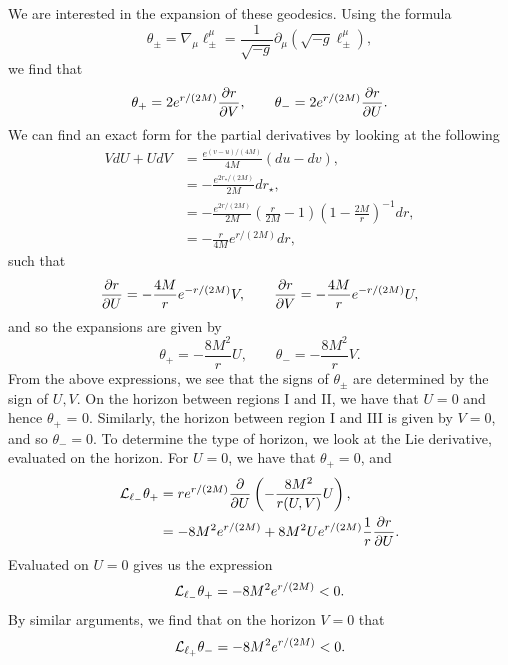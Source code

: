 We are interested in the expansion of these geodesics. Using the formula
\begin{equation*}
	\theta_\pm = \nabla_\mu \ell^{\mu}_\pm = \frac{1}{\sqrt{-g}} \partial_\mu \left(\sqrt{-g} \ell^\mu_\pm \right),
\end{equation*}
we find that
\begin{equation*}
	\theta_+ = 2 e^{r/(2M)} \frac{\partial r}{\partial V}, \qquad \theta_- = 2 e^{r/(2M)} \frac{\partial r}{\partial U}.
\end{equation*}
We can find an exact form for the partial derivatives by looking at the following
\begin{equation*}
\begin{aligned}
		VdU + UdV &= \frac{e^{(v-u)/(4M)}}{4M} \left( du - dv \right), \\
		&= - \frac{e^{2r_\star / (2M)}}{2M} dr_\star ,\\
		&= - \frac{e^{2r / (2M)}}{2M} \left(\frac{r}{2M} - 1\right) \left(1 - \frac{2M}{r} \right)^{-1}  dr ,\\
		&= - \frac{r}{4M} e^{r/(2M)} dr,
\end{aligned}
\end{equation*}
such that
\begin{equation*}
	\frac{\partial r}{\partial U} = - \frac{4M}{r} e^{-r/(2M)} V, \qquad \frac{\partial r}{\partial V} = - \frac{4M}{r} e^{-r/(2M)} U,
\end{equation*}
and so the expansions are given by
\begin{equation*}
	\theta_+ = - \frac{8M^2}{r} U, \qquad \theta_- = - \frac{8M^2}{r} V.
\end{equation*}
From the above expressions, we see that the signs of $\theta_\pm$ are determined by the sign of $U,V$. On the horizon between regions I and II, we have that $U = 0$ and hence $\theta_+$ = 0. Similarly,  the horizon between region I and III is given by $V = 0$, and so $\theta_- = 0$. To determine the type of horizon, we look at the Lie derivative, evaluated on the horizon. For $U = 0$, we have that $\theta_+ = 0$, and 
\begin{equation*}
\begin{aligned}
	{\cal L}_{\ell_-} \theta_+ &= r e^{r / (2M)} \frac{\partial }{\partial U} \left(- \frac{8M^2}{r(U,V)} U \right), \\
	&= -8M^2 e^{r / (2M)} + 8M^2 U e^{r / (2M)}\frac{1}{r} \frac{\partial r}{\partial U}.
\end{aligned}
\end{equation*}
Evaluated on $U = 0$ gives us the expression
\begin{equation*}
\begin{aligned}
	{\cal L}_{\ell_-} \theta_+ = -8M^2 e^{r / (2M)} < 0.
\end{aligned}
\end{equation*}
By similar arguments, we find that on the horizon $V = 0$ that
\begin{equation*}
	{\cal L}_{\ell_+} \theta_- = -8M^2 e^{r / (2M)} < 0.
\end{equation*}

